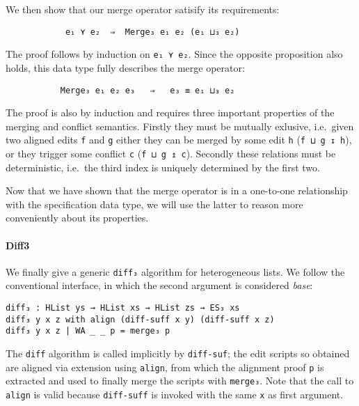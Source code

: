 \documentclass[preprint]{sigplanconf}
\begin{document}
        We then show that our merge operator satisify its requirements:
\begin{verbatim}
            e₁ ⋎ e₂  ⇒  Merge₃ e₁ e₂ (e₁ ⊔₃ e₂)
\end{verbatim}
        The proof follows by induction on \texttt{e₁ ⋎ e₂}. Since the opposite
        proposition also holds, this data type fully describes the merge operator:
\begin{verbatim}
           Merge₃ e₁ e₂ e₃   ⇒   e₃ ≡ e₁ ⊔₃ e₂
\end{verbatim}
        The proof is also by induction and requires three important properties of
        the merging and conflict semantics.
        Firstly they must be mutually exlusive, i.e.\ given
        two aligned edits \texttt{f} and \texttt{g} either they can be merged by
        some edit \texttt{h} (\texttt{f ⊔ g ↧ h}), or they trigger some conflict
        \texttt{c} (\texttt{f ⊔ g ↥ c}). Secondly these relations must be deterministic, i.e.\
        the third index is uniquely determined by the first two.
        
        Now that we have shown that the merge operator is in a one-to-one 
        relationship with the specification data type, we will use the latter
        to reason more conveniently about its properties.

	\paragraph{Diff3}
	We finally give a generic \texttt{diff₃} algorithm for
        heterogeneous lists.
        We follow the conventional interface, in which the second
        argument is considered \emph{base}:
\begin{verbatim}
diff₃ : HList ys → HList xs → HList zs → ES₃ xs
diff₃ y x z with align (diff-suff x y) (diff-suff x z)
diff₃ y x z | WA _ _ p = merge₃ p
\end{verbatim}
	
	The \texttt{diff} algorithm is called implicitly by
        \texttt{diff-suf}; the edit scripts so obtained are aligned
        via extension using \texttt{align}, from which the alignment
        proof \texttt{p} is extracted and used to finally merge the
        scripts with \texttt{merge₃}.  Note that the call to
        \texttt{align} is valid because \texttt{diff-suff} is invoked
        with the same \texttt{x} as first argument.
\end{document}
